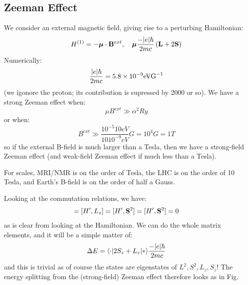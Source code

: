 \subsection{Zeeman Effect}
We consider an external magnetic field, giving rise to a perturbing Hamiltonian:
\begin{equation}
    H^{(1)} = -\gv{\mu} \cdot \v{B}^{ext}, \quad \gv{\mu}\frac{-\abs{e}\hbar}{2mc}\left(\v{L} + 2\v{S}\right)
\end{equation}
Numerically:
\begin{equation}
    \frac{\abs{e}\hbar}{2mc} = 5.8 \times 10^{-9}\si{eVG^{-1}}
\end{equation}
(we igonore the proton; its contribution is supressed by 2000 or so). We have a strong Zeeman effect when:
\begin{equation}
    \mu B^{ext} \gg \alpha^2 \si{Ry}
\end{equation}
or when:
\begin{equation}
    B^{ext} \gg \frac{10^{-5}10\si{eV}}{10 10^{-9} \si{eV}} G = 10^4 \si{G} = 1\si{T}
\end{equation}
so if the external B-field is much larger than a Tesla, then we have a strong-field Zeeman effect (and weak-field Zeeman effect if much less than a Tesla). 

For scales, MRI/NMR is on the order of Tesla, the LHC is on the order of 10 Tesla, and Earth's B-field is on the order of half a Gauss.

Looking at the commutation relations, we have:
\begin{equation}
    [H', \v{L}^2] = [H', L_z] = [H', \v{S}^2] = [H', \v{S}^2] = 0
\end{equation}
as is clear from looking at the Hamiltonian. We can do the whole matrix elements, and it will be a simple matter of:
\begin{equation}
    \Delta E = \bra{\cdot}2S_z + L_z\ket{*} \frac{-\abs{e}\hbar}{2mc}
\end{equation}
and this is trivial as of course the states are eigenstates of $L^2, S^2, L_z, S_z$! The energy splitting from the (strong-field) Zeeman effect therefore looks as in Fig. 

